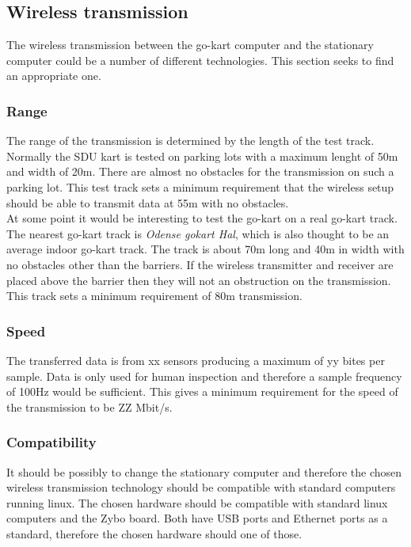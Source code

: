 \subsection{Wireless transmission}
The wireless transmission between the go-kart computer and the stationary computer could be a number of different technologies.
This section seeks to find an appropriate one.

\subsubsection{Range}
The range of the transmission is determined by the length of the test track. 
Normally the SDU kart is tested on parking lots with a maximum lenght of 50m and width of 20m.
There are almost no obstacles for the transmission on such a parking lot. 
This test track sets a minimum requirement that the wireless setup should be able to transmit data at 55m with no obstacles.
\\
At some point it would be interesting to test the go-kart on a real go-kart track. 
The nearest go-kart track is \textit{Odense gokart Hal}, which is also thought to be an average indoor go-kart track.
The track is about 70m long and 40m in width with no obstacles other than the barriers. 
If the wireless transmitter and receiver are placed above the barrier then they will not an obstruction on the transmission. 
This track sets a minimum requirement of 80m transmission. 

\subsubsection{Speed}
The transferred data is from xx sensors producing a maximum of yy bites per sample. 
Data is only used for human inspection and therefore a sample frequency of 100Hz would be sufficient.
This gives a minimum requirement for the speed of the transmission to be ZZ Mbit/s. 

\subsubsection{Compatibility}
It should be possibly to change the stationary computer and therefore the chosen wireless transmission technology should be compatible with standard computers running linux.
The chosen hardware should be compatible with standard linux computers and the Zybo board. 
Both have USB ports and Ethernet ports as a standard, therefore the chosen hardware should one of those.

